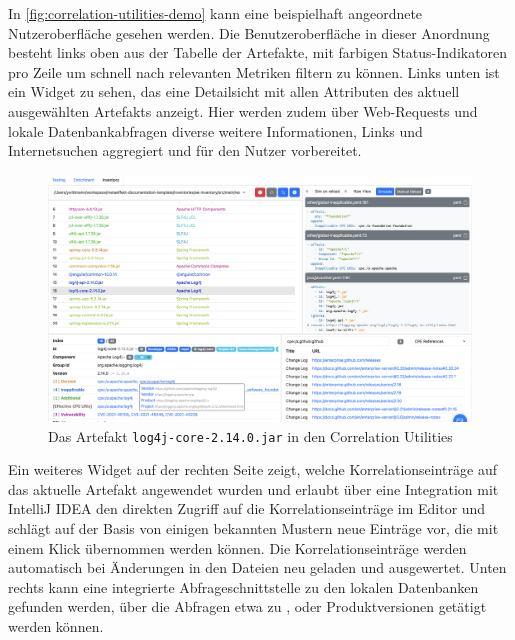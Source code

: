 In \autoref{fig:correlation-utilities-demo} kann eine beispielhaft angeordnete Nutzeroberfläche gesehen werden.
Die Benutzeroberfläche in dieser Anordnung besteht links oben aus der Tabelle der Artefakte, mit farbigen Status-Indikatoren pro Zeile um schnell nach relevanten Metriken filtern zu können.
Links unten ist ein Widget zu sehen, das eine Detailsicht mit allen Attributen des aktuell ausgewählten Artefakts anzeigt.
Hier werden zudem über Web-Requests und lokale Datenbankabfragen diverse weitere Informationen, Links und Internetsuchen aggregiert und für den Nutzer vorbereitet.

\begin{landscape}
    \begin{figure}
        \centering
        \includegraphics[keepaspectratio,width=\linewidth]{../../images/correlation-utilities-demo}
        \caption{Das Artefakt \texttt{log4j-core-2.14.0.jar} in den Correlation Utilities}
        \label{fig:correlation-utilities-demo}
    \end{figure}
\end{landscape}

Ein weiteres Widget auf der rechten Seite zeigt, welche Korrelationseinträge auf das aktuelle Artefakt angewendet wurden und erlaubt über eine Integration mit IntelliJ IDEA den direkten Zugriff auf die Korrelationseinträge im Editor und schlägt auf der Basis von einigen bekannten Mustern neue Einträge vor, die mit einem Klick übernommen werden können.
Die Korrelationseinträge werden automatisch bei Änderungen in den Dateien neu geladen und ausgewertet.
Unten rechts kann eine integrierte Abfrageschnittstelle zu den lokalen Datenbanken gefunden werden, über die Abfragen etwa zu ,  oder Produktversionen getätigt werden können.

